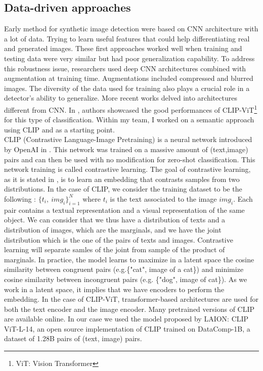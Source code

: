 \documentclass[12pt,a4paper]{article}
\begin{document}
\subsection{Data-driven approaches}
Early method for synthetic image detection were based on CNN architecture with a lot of data. Trying to learn useful features that could help differentiating real and generated images. These first approaches worked well when training and testing data were very similar but had poor generalization capability. To address this robustness issue, researchers used deep CNN architectures combined with augmentation at training time. Augmentations included compressed and blurred images. The diversity of the data used for training also plays a crucial role in a detector's ability to generalize. More recent works delved into architectures different from CNN. In \autocite*{cozzolinoRaisingBarAIgenerated2024}, authors showcased the good performances of CLIP-ViT\footnote{ViT: Vision Transformer} for this type of classification. Within my team, I worked on a semantic approach using CLIP and \autocite*{cozzolinoRaisingBarAIgenerated2024} as a starting point.\\
CLIP (Contrastive Language-Image Pretraining) is a neural network introduced by OpenAI in \autocite*{radfordLearningTransferableVisual2021}. This network was trained on a massive amount of (text,image) pairs and can then be used with no modification for zero-shot classification. This network training is called contrastive learning. The goal of contrastive learning, as it is stated in \autocite*{tianContrastiveMultiviewCoding2020}, is to learn an embedding that contrasts samples from two distributions. In the case of CLIP, we consider the training dataset to be the following : $\{t_i,\ img_i\}_{i=1}^N$ where $t_i$ is the text associated to the image $img_i$. Each pair contains a textual representation and a visual representation of the same object. We can consider that we thus have a distribution of texts and a distribution of images, which are the marginals, and we have the joint distribution which is the one of the pairs of texts and images. Contrastive learning will separate samles of the joint from sample of the product of marginals. In practice, the model learns to maximize in a latent space the cosine similarity between congruent pairs (e.g.\{"cat", image of a cat\}) and minimize cosine similarity between incongruent pairs (e.g. \{"dog", image of cat\}). As we work in a latent space, it implies that we have encoders to perform the embedding. In the case of CLIP-ViT, transformer-based architectures are used for both the text encoder and the image encoder. Many pretrained versions of CLIP are available online. In our case we used the model proposed by LAION: CLIP ViT-L-14, an open source implementation of CLIP trained on DataComp-1B, a dataset of 1.28B pairs of (text, image) pairs.
\end{document}
